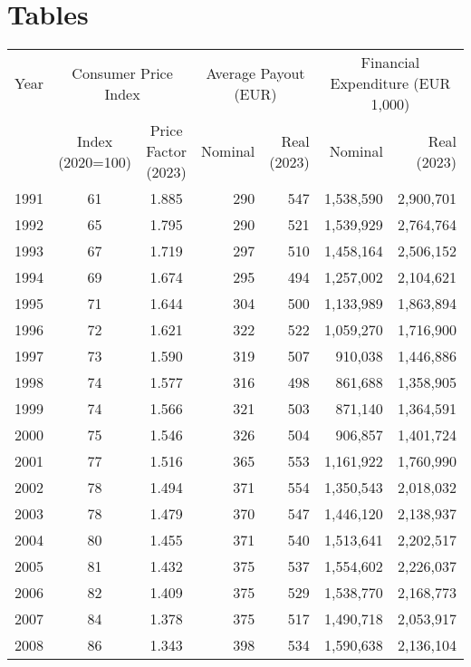 \newpage
\section{Tables}
\renewcommand{\thetable}{\thesection \arabic{table}}
\setcounter{table}{0}

\begingroup
\setlength{\tabcolsep}{4pt}
\renewcommand{\arraystretch}{1.25}
  \begin{table}
  \centering
  \begin{tabular}{rcc|rr|rr}
  \toprule
  Year & \multicolumn{2}{c|}{Consumer Price Index} & \multicolumn{2}{c|}{Average Payout (EUR)} & \multicolumn{2}{c}{Financial Expenditure (EUR 1,000)} \\
  \cmidrule(lr){2-3} \cmidrule(lr){4-5} \cmidrule(l){6-7}
  & Index (2020=100) & Price Factor (2023) & Nominal & Real (2023) & Nominal & Real (2023) \\
  \midrule
  1991 & 61 & 1.885 & 290 & 547 & 1,538,590 & 2,900,701 \\
  1992 & 65 & 1.795 & 290 & 521 & 1,539,929 & 2,764,764 \\
  1993 & 67 & 1.719 & 297 & 510 & 1,458,164 & 2,506,152 \\
  1994 & 69 & 1.674 & 295 & 494 & 1,257,002 & 2,104,621 \\
  1995 & 71 & 1.644 & 304 & 500 & 1,133,989 & 1,863,894 \\
  1996 & 72 & 1.621 & 322 & 522 & 1,059,270 & 1,716,900 \\
  1997 & 73 & 1.590 & 319 & 507 & 910,038 & 1,446,886 \\
  1998 & 74 & 1.577 & 316 & 498 & 861,688 & 1,358,905 \\
  1999 & 74 & 1.566 & 321 & 503 & 871,140 & 1,364,591 \\
  2000 & 75 & 1.546 & 326 & 504 & 906,857 & 1,401,724 \\
  2001 & 77 & 1.516 & 365 & 553 & 1,161,922 & 1,760,990 \\
  2002 & 78 & 1.494 & 371 & 554 & 1,350,543 & 2,018,032 \\
  2003 & 78 & 1.479 & 370 & 547 & 1,446,120 & 2,138,937 \\
  2004 & 80 & 1.455 & 371 & 540 & 1,513,641 & 2,202,517 \\
  2005 & 81 & 1.432 & 375 & 537 & 1,554,602 & 2,226,037 \\
  2006 & 82 & 1.409 & 375 & 529 & 1,538,770 & 2,168,773 \\
  2007 & 84 & 1.378 & 375 & 517 & 1,490,718 & 2,053,917 \\
  2008 & 86 & 1.343 & 398 & 534 & 1,590,638 & 2,136,104 \\

\end{tabular}
\end{table}
